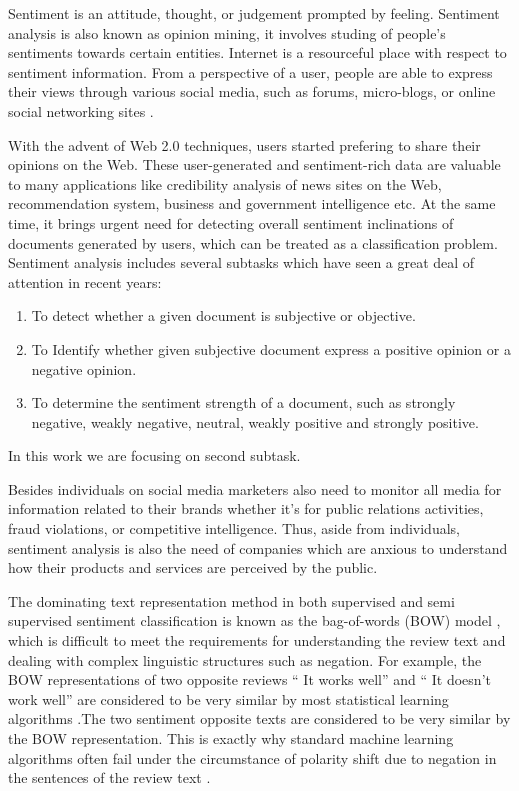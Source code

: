 \documentclass[oneside,a4paper,12pt]{pictreport}
\begin{document}
\par Sentiment is an attitude, thought, or judgement prompted by feeling. Sentiment analysis 
is also known as opinion mining, it involves studing of people’s sentiments towards 
certain entities. Internet is a resourceful place with respect to sentiment information. From a
perspective of a user, people are able to express their views through various social media,
such as forums, micro-blogs, or online social networking sites \cite{pang2008}.

\par With the advent of Web 2.0 techniques,
users started prefering to share their opinions on the Web. These user-generated and 
sentiment-rich data are valuable to many applications like 
credibility analysis of news sites on the Web, recommendation system, business and 
government intelligence etc. At the same time, it brings
urgent need for detecting overall sentiment inclinations of
documents generated by users, which can be treated as a
classification problem. Sentiment analysis includes several
subtasks  which have seen a great deal of attention in recent years:
\begin{enumerate}
 \item To detect whether a given document is subjective or objective.
  \item To Identify whether given subjective document express a positive opinion or a negative opinion.
  \item To determine the sentiment strength of a document,
such as strongly negative, weakly negative, neutral, weakly
positive and strongly positive.
\end{enumerate}

In this work we are focusing on second subtask.

\par Besides individuals on social media marketers also need to monitor all media for information related to their brands
whether it’s for public relations activities, fraud violations, or competitive intelligence.
Thus, aside from individuals, sentiment analysis is also the need of companies which are anxious to understand how
their products and services are perceived by the public.

\par The dominating text representation method in
both supervised and 
semi supervised sentiment
classification is known as the bag-of-words (BOW)
model \cite{pang}, which is difficult to meet the requirements
for understanding the review text and dealing with
complex linguistic structures such as negation. For
example, the BOW representations of two opposite
reviews `` It works well'' and `` It doesn't work well''
are considered to be very similar by most statistical
learning algorithms \cite{yahoo}.The two sentiment opposite texts are considered to be very similar by the
BOW representation. This is exactly why standard machine learning algorithms often
fail under the circumstance of polarity shift due to negation in the sentences of the review text \cite{contrast} \cite{xiaOriginal}.
\end{document}
